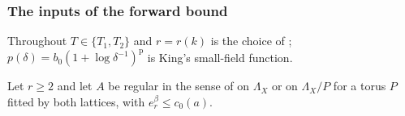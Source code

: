 
\subsubsection*{The inputs of the forward bound}

Throughout $T\in\{T_1,T_2\}$ and $r=r(k)$ is the choice of ; $p(\delta)=b_0(1+\log\delta^{-1})^{\mathrm p}$ is King's small-field function.

\begin{proposition}\label{rot:prop:BD}
Let $r\ge2$ and let $A$ be regular in the sense of \cite[Def.~3.2]{K1} on $\Lambda_X$ or on $\Lambda_X/P$ for a torus $P$ fitted by both lattices, with $e_r^\beta\le c_0(a)$.
\begin{enumerate}[label=\textup{(\alph*)},leftmargin=*]

\end{enumerate}
\end{proposition}
